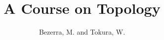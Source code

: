 \documentclass[a4paper,12pt,leqno]{book}
\title{A Course on Topology}
\author{Bezerra, M. and Tokura, W.}
\begin{document}
\frontmatter

\tableofcontents

\mainmatter


\backmatter

\nocite{*}


\end{document}

